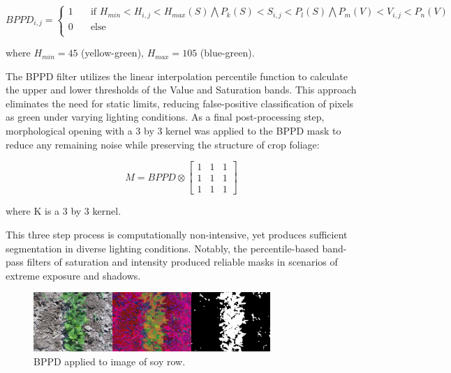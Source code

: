 \documentclass[authoryear]{elsarticle}
\begin{document}
\begin{equation}
BPPD_{i,j} =
  \begin{cases}
    1  & \quad \text{if } H_{min}<H_{i,j}<H_{max}(S) \bigwedge P_{k}(S)< S_{i,j} <P_{l}(S) \bigwedge P_{m}(V)< V_{i,j}<P_{n}(V)\text{ }\\
    0  & \quad \text{else}\\
  \end{cases}
  \label{eq:bppd}
\end{equation}
\begin{flushleft}
where $H_{min}=45$ (yellow-green), $H_{max}=105$ (blue-green).
\end{flushleft}

The BPPD filter utilizes the linear interpolation percentile function
to calculate the upper and lower thresholds of the Value and
Saturation bands. This approach eliminates the need for static limits,
reducing false-positive classification of pixels as green under
varying lighting conditions. As a final post-processing step,
morphological opening with a 3 by 3 kernel was applied to the BPPD
mask to reduce any remaining noise while preserving the structure of
crop foliage:

\begin{equation}
M = BPPD \otimes
\begin{bmatrix}
       1 & 1 & 1 \\
       1 & 1 & 1 \\
       1 & 1 & 1
     \end{bmatrix}
\label{eq:morph_opening}
\end{equation}
\begin{flushleft}
where K is a 3 by 3 kernel.
\end{flushleft}

This three step process is computationally non-intensive, yet produces
sufficient segmentation in diverse lighting conditions. Notably, the
percentile-based band-pass filters of saturation and intensity
produced reliable masks in scenarios of extreme exposure and shadows.

\begin{figure}
  \centering
  \includegraphics[width=0.8\textwidth,natwidth=610,natheight=642]{bppd_normal.jpg}
  \caption{BPPD applied to image of soy row.}
  \label{fig:bppd_normal}
\end{figure}
\end{document}
